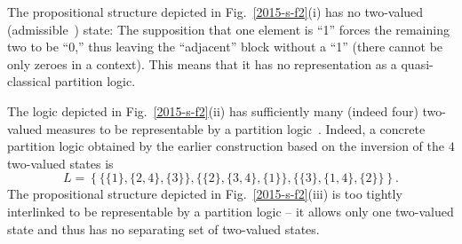 The propositional structure depicted in Fig.~\ref{2015-s-f2}(i) has no two-valued
(admissible~\cite{2012-incomput-proofsCJ,PhysRevA.89.032109,2015-AnalyticKS}) state:
The supposition that one element is ``1'' forces the remaining two to be ``0,''
thus leaving the ``adjacent'' block without a ``1'' (there cannot be only zeroes in a context).
This means that it has no representation as a quasi-classical partition logic.

The logic depicted in Fig.~\ref{2015-s-f2}(ii) has sufficiently many (indeed four)
two-valued measures
to be representable by a partition logic~\cite{2010-qchocolate}.
Indeed, a concrete partition logic obtained by the earlier construction based on the inversion of the $4$ two-valued states is
\begin{equation}
L=
\left\{
\{ \{ 1\}, \{2,4\}, \{3\}\},
\{ \{ 2\}, \{3,4\}, \{1\}\},
\{ \{ 3\}, \{1,4\}, \{2\}\}
\right\} .
\end{equation}
The propositional structure depicted in Fig.~\ref{2015-s-f2}(iii)
is too tightly interlinked to be representable by a partition logic -- it allows only one two-valued state
and thus has no separating set of two-valued states.

